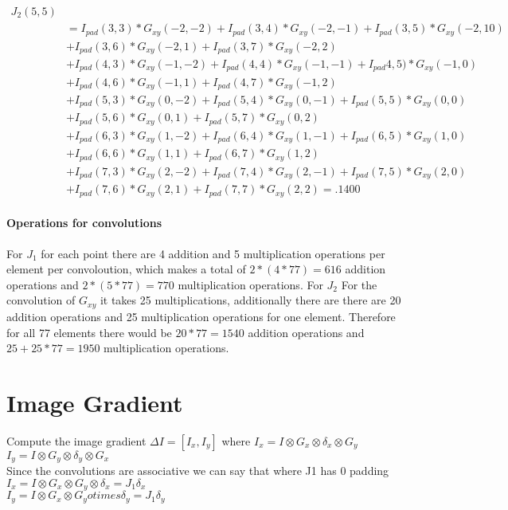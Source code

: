 \documentclass[11pt,english]{article}
\begin{document}
\begin{align*}
J_2(5,5) \\
&= I_{pad}(3,3)*G_{xy}(-2,-2) + I_{pad}(3,4)*G_{xy}(-2,-1) + I_{pad}(3,5)*G_{xy}(-2,10) \\
&+I_{pad}(3,6)*G_{xy}(-2,1) +  I_{pad}(3,7)*G_{xy}(-2,2) \\
&+I_{pad}(4,3)*G_{xy}(-1,-2) + I_{pad}(4,4)*G_{xy}(-1,-1) + I_{pad}4,5)*G_{xy}(-1,0)\\
&+ I_{pad}(4,6)*G_{xy}(-1,1)+  I_{pad}(4,7)*G_{xy}(-1,2)\\
&+I_{pad}(5,3)*G_{xy}(0,-2) + I_{pad}(5,4)*G_{xy}(0,-1) + I_{pad}(5,5)*G_{xy}(0,0) \\
&+I_{pad}(5,6)*G_{xy}(0,1) + I_{pad}(5,7)*G_{xy}(0,2)\\
&+I_{pad}(6,3)*G_{xy}(1,-2) + I_{pad}(6,4)*G_{xy}(1,-1) + I_{pad}(6,5)*G_{xy}(1,0)\\
&+I_{pad}(6,6)*G_{xy}(1,1) + I_{pad}(6,7)*G_{xy}(1,2)\\ 
&+I_{pad}(7,3)*G_{xy}(2,-2) + I_{pad}(7,4)*G_{xy}(2,-1) + I_{pad}(7,5)*G_{xy}(2,0)\\
&+I_{pad}(7,6)*G_{xy}(2,1) + I_{pad}(7,7)*G_{xy}(2,2) = .1400
\end{align*}

\paragraph{Operations for convolutions}
For $J_1$ for each point there are 4 addition and 5 multiplication operations per element per convoloution, which makes a total of $2*(4*77) = 616$ addition operations and $2*(5*77) = 770$ multiplication operations. 
For $J_2$  For the convolution of $G_{xy}$ it takes 25 multiplications, additionally  there are there are 20 addition operations and 25 multiplication operations for one element. Therefore for all 77 elements there would be  $ 20*77  = 1540$ addition operations and $25 + 25*77 = 1950$ multiplication operations. 

\section*{Image Gradient}
 Compute the image gradient $\Delta I =[I_x, I_y]$ where 
 $I_x = I \otimes G_x \otimes \delta_x \otimes G_y $ 
 \\
 $I_y = I \otimes G_y \otimes \delta_y \otimes G_x $ 
 \\ 
 
 Since the convolutions are associative we can say that  where J1 has 0 padding 
 $I_x = I \otimes G_x \otimes G_y \otimes \delta_x  = J_1 \delta_x $ 
 \\ 
  $I_y = I \otimes G_x \otimes G_y otimes \delta_y  = J_1 \delta_y $ 
  \\ 
  
\end{document}
